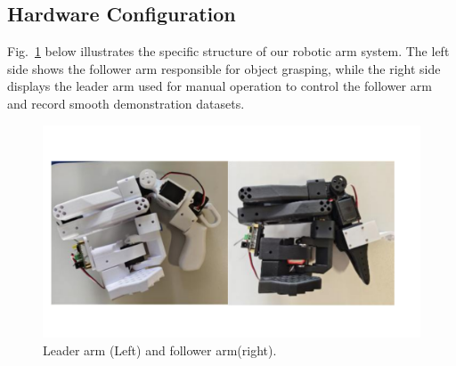 \documentclass[runningheads]{llncs}
\begin{document}
\subsection{Hardware Configuration}
Fig.~\ref{fig2-1} below illustrates the specific structure of our robotic arm system. The left side shows the follower arm responsible for object grasping, while the right side displays the leader arm used for manual operation to control the follower arm and record smooth demonstration datasets.


\begin{figure}
\centering
\includegraphics[width=\textwidth]{fig3.pdf}
\caption{Leader arm (Left) and follower arm(right).} \label{fig2-1}
\end{figure}

\end{document}
